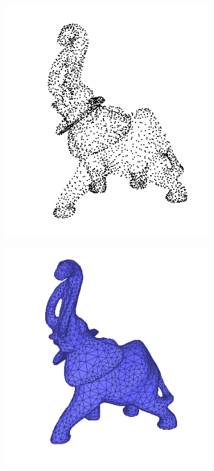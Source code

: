 \documentclass{beamer}
\begin{document}
\begin{frame}
    \begin{figure}
        \centering
        \begin{subfigure}{.4\textwidth}
            \centering
            \includegraphics[scale=0.3]{img/elephant-point-cloud}
        \end{subfigure}
        \begin{subfigure}{.4\textwidth}
            \centering
            \includegraphics[scale=0.3]{img/elephant-mesh}
        \end{subfigure}
    \end{figure}
\end{frame}
\end{document}

